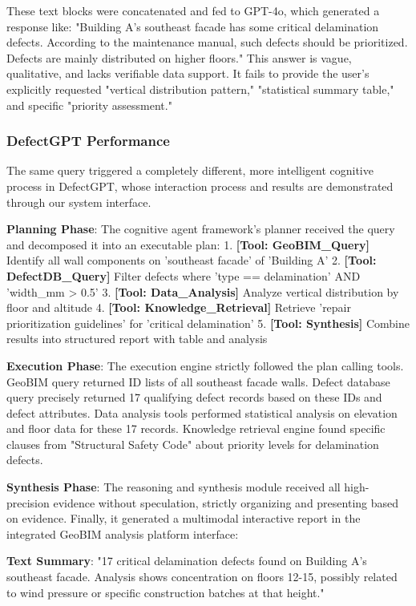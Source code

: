 These text blocks were concatenated and fed to GPT-4o, which generated a response like: "Building A's southeast facade has some critical delamination defects. According to the maintenance manual, such defects should be prioritized. Defects are mainly distributed on higher floors." This answer is vague, qualitative, and lacks verifiable data support. It fails to provide the user's explicitly requested "vertical distribution pattern," "statistical summary table," and specific "priority assessment."

\subsubsection{DefectGPT Performance}

The same query triggered a completely different, more intelligent cognitive process in DefectGPT, whose interaction process and results are demonstrated through our system interface.

\textbf{Planning Phase}: The cognitive agent framework's planner received the query and decomposed it into an executable plan:
1. \textbf{[Tool: GeoBIM\_Query]} Identify all wall components on 'southeast facade' of 'Building A'
2. \textbf{[Tool: DefectDB\_Query]} Filter defects where 'type == delamination' AND 'width\_mm > 0.5'
3. \textbf{[Tool: Data\_Analysis]} Analyze vertical distribution by floor and altitude
4. \textbf{[Tool: Knowledge\_Retrieval]} Retrieve 'repair prioritization guidelines' for 'critical delamination'
5. \textbf{[Tool: Synthesis]} Combine results into structured report with table and analysis

\textbf{Execution Phase}: The execution engine strictly followed the plan calling tools. GeoBIM query returned ID lists of all southeast facade walls. Defect database query precisely returned 17 qualifying defect records based on these IDs and defect attributes. Data analysis tools performed statistical analysis on elevation and floor data for these 17 records. Knowledge retrieval engine found specific clauses from "Structural Safety Code" about priority levels for delamination defects.

\textbf{Synthesis Phase}: The reasoning and synthesis module received all high-precision evidence without speculation, strictly organizing and presenting based on evidence. Finally, it generated a multimodal interactive report in the integrated GeoBIM analysis platform interface:

\textbf{Text Summary}: "17 critical delamination defects found on Building A's southeast facade. Analysis shows concentration on floors 12-15, possibly related to wind pressure or specific construction batches at that height."


